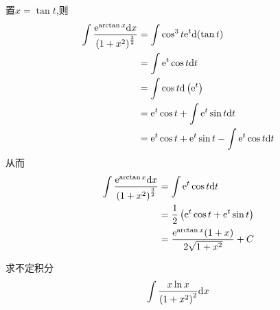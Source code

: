 \documentclass{ctexart}
\begin{document}
\begin{solution}
    置$x=\tan t$,则
    $$\begin{aligned}
        \int\dfrac{\mathrm{e}^{\arctan{x}}\mathrm{d} x}{\left(1+x^2\right)^\frac{3}{2}}
        &= \int{\cos^3t\mathrm{e}^t\mathrm{d}(\tan t)} \\
        &= \int{\mathrm{e}^t\cos t\mathrm{d}t} \\
        &= \int{\cos t\mathrm{d}\left(\mathrm{e}^t\right)} \\
        &= \mathrm{e}^t\cos t+\int{\mathrm{e}^t\sin t\mathrm{d}t} \\
        &= \mathrm{e}^t\cos t+\mathrm{e}^t\sin t-\int{\mathrm{e}^t\cos t\mathrm{d}t}
    \end{aligned}$$
    从而$$\begin{aligned}
        \int\dfrac{\mathrm{e}^{\arctan{x}}\mathrm{d} x}{\left(1+x^2\right)^\frac{3}{2}}
        &= \int{\mathrm{e}^t\cos t\mathrm{d}t} \\
        &= \dfrac{1}{2}\left(\mathrm{e}^t\cos t+\mathrm{e}^t\sin t\right) \\
        &= \dfrac{\mathrm{e}^{\arctan{x}}(1+x)}{2\sqrt{1+x^2}}+C
    \end{aligned}$$
\end{solution}
\begin{problem}[Problem 7.]
    求不定积分$$\int{\dfrac{x\ln{x}}{\left(1+x^2\right)^2}\mathrm{d}x}$$
\end{problem}
\begin{solution}[Solution.]
    
\end{solution}
\end{document}
